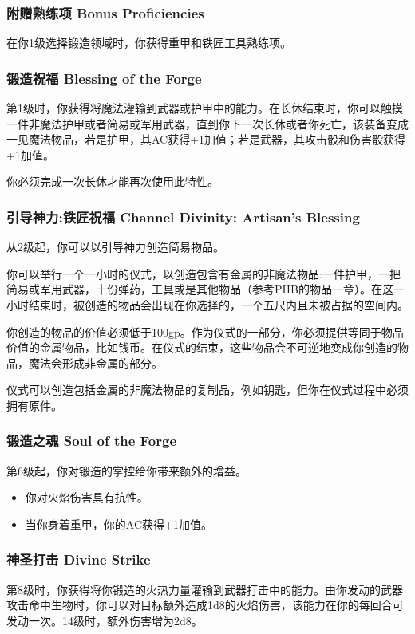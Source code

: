 \subsubsection{附赠熟练项 Bonus Proficiencies}

在你1级选择锻造领域时，你获得重甲和铁匠工具熟练项。

\subsubsection{锻造祝福 Blessing of the Forge}
第1级时，你获得将魔法灌输到武器或护甲中的能力。在长休结束时，你可以触摸一件非魔法护甲或者简易或军用武器，直到你下一次长休或者你死亡，该装备变成一见魔法物品，若是护甲，其AC获得+1加值；若是武器，其攻击骰和伤害骰获得+1加值。

你必须完成一次长休才能再次使用此特性。

\subsubsection{引导神力:铁匠祝福 Channel Divinity: Artisan's Blessing}

从2级起，你可以以引导神力创造简易物品。

你可以举行一个一小时的仪式，以创造包含有金属的非魔法物品:一件护甲，一把简易或军用武器，十份弹药，工具或是其他物品（参考PHB的物品一章）。在这一小时结束时，被创造的物品会出现在你选择的，一个五尺内且未被占据的空间内。

你创造的物品的价值必须低于100gp。作为仪式的一部分，你必须提供等同于物品价值的金属物品，比如钱币。在仪式的结束，这些物品会不可逆地变成你创造的物品，魔法会形成非金属的部分。

仪式可以创造包括金属的非魔法物品的复制品，例如钥匙，但你在仪式过程中必须拥有原件。

\subsubsection{锻造之魂 Soul of the Forge}

第6级起，你对锻造的掌控给你带来额外的增益。
\begin{itemize}
\item 你对火焰伤害具有抗性。
\item 当你身着重甲，你的AC获得+1加值。
\end{itemize}
\subsubsection{神圣打击 Divine Strike}
第8级时，你获得将你锻造的火热力量灌输到武器打击中的能力。由你发动的武器攻击命中生物时，你可以对目标额外造成1d8的火焰伤害，该能力在你的每回合可发动一次。14级时，额外伤害增为2d8。

